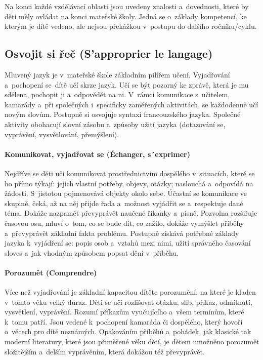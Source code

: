 Na konci každé vzdělávací oblasti jsou uvedeny znalosti a~dovednosti, které by děti měly ovládat na konci mateřské školy. Jedná se o~základy kompetencí, ke kterým je dítě vedeno, ale nejsou překážkou v~postupu do dalšího ročníku/cyklu.

		\subsection{Osvojit si řeč (S'approprier le langage)}
			Mluvený jazyk je v mateřské škole základním pilířem učení. Vyjadřování a~pochopení se dítě učí skrze jazyk. Učí se být pozorný ke zprávě, která je mu sdělena, pochopit ji a odpovědět na ni. V rámci komunikace s učitelem, kamarády a~při společných i~specificky zaměřených aktivitách, se každodenně učí novým slovům. Postupně si osvojuje syntaxi francouzského jazyka. Společné aktivity obohacují slovní zásobu a~způsoby užití jazyka (dotazování se, vyprávění, vysvětlování, přemýšlení).

			\paragraph{Komunikovat, vyjadřovat se (Échanger, s´exprimer)}

			Nejdříve se děti učí komunikovat prostřednictvím dospělého v situacích, které se ho přímo týkají: jejich vlastní potřeby, objevy, otázky; naslouchá a~odpovídá na žádosti. S jistotou pojmenovává objekty okolo sebe. Účastní se komunikace ve skupině, čeká, až na něj přijde řada a~možnost vyjádřit se a~respektuje dané téma. Dokáže nazpaměť převyprávět naučené říkanky a~písně. Pozvolna rozšiřuje časovou osu, mluví o~tom, co se bude dít, co zažilo, dokáže vymýšlet příběhy a~převyprávět základní fakta problému. Postupně získává potřebné základy jazyka k vyjádření se: popis osob a~vztahů mezi nimi, užití správného časování sloves a~jak vhodným způsobem popsat dění v příběhu.

			\paragraph{Porozumět (Comprendre)}
			Více než vyjadřování je základní kapacitou dítěte porozumění, na které je kladen v tomto věku velký důraz.
			Děti se učí rozlišovat otázku, slib, příkaz, odmítnutí, vysvětlení, vyprávění. Rozumí příkazům vyučujícího a~všem termínům, které k tomu patří. Jsou vedené k pochopení kamaráda či dospělého, který hovoří o~věcech pro dítě neznámých. Opakováním příběhů a pohádek, jak klasické tak moderní literatury, které jsou přiměřené věku dětí, je dětem umožněno porozumět složitějším a~delším vyprávěním, která dokážou též převyprávět. 

